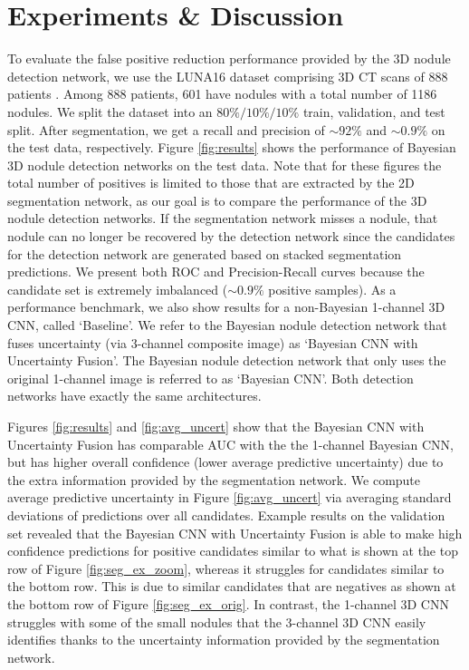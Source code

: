 \documentclass{article}
\begin{document}
\section{Experiments \& Discussion}\label{sec:res}%

To evaluate the false positive reduction performance provided by the 3D nodule detection network, we use the LUNA16 dataset comprising 3D CT scans of 888 patients \cite{luna16}. Among 888 patients, 601 have nodules with a total number of 1186 nodules. We split the dataset into an $80\%/10\%/10\%$ train, validation, and test split. After segmentation, we get a recall and precision of ${\sim}92\%$ and ${\sim}0.9\%$ on the test data, respectively. 
Figure \ref{fig:results} shows the performance of Bayesian 3D nodule detection networks on the test data. Note that for these figures the total number of positives is limited to those that are extracted by the 2D segmentation network, as our goal is to compare the performance of the 3D nodule detection networks. If the segmentation network misses a nodule, that nodule can no longer be recovered by the detection network since the candidates for the detection network are generated based on stacked segmentation predictions. We present both ROC and Precision-Recall curves because the candidate set is extremely imbalanced (${\sim}0.9\%$ positive samples). As a performance benchmark, we also show results for a non-Bayesian 1-channel 3D CNN, called `Baseline'. We refer to the Bayesian nodule detection network that fuses uncertainty (via 3-channel composite image) as `Bayesian CNN with Uncertainty Fusion'. The Bayesian nodule detection network that only uses the original 1-channel image is referred to as `Bayesian CNN'. Both detection networks have exactly the same architectures. 

Figures \ref{fig:results} and \ref{fig:avg_uncert} show that the Bayesian CNN with Uncertainty Fusion has comparable AUC with the the 1-channel Bayesian CNN, but has higher overall confidence (lower average predictive uncertainty) due to the extra information provided by the segmentation network. We compute average predictive uncertainty in Figure \ref{fig:avg_uncert} via averaging standard deviations of predictions over all candidates. Example results on the validation set revealed that the Bayesian CNN with Uncertainty Fusion is able to make high confidence predictions for positive candidates similar to what is shown at the top row of Figure \ref{fig:seg_ex_zoom}, whereas it struggles for candidates similar to the bottom row. This is due to similar candidates that are negatives as shown at the bottom row of Figure \ref{fig:seg_ex_orig}. In contrast, the 1-channel 3D CNN struggles with some of the small nodules that the 3-channel 3D CNN easily identifies thanks to the uncertainty information provided by the segmentation network. 
\end{document}
